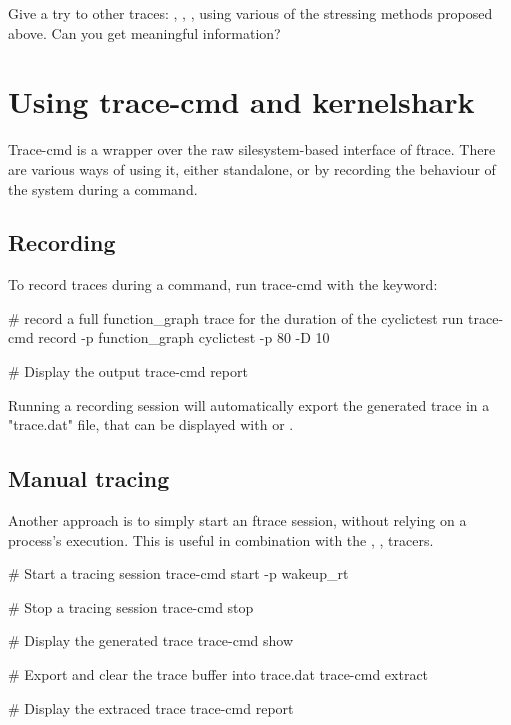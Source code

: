 Give a try to other traces: , , ,
using various of the stressing methods proposed above. Can you get meaningful information?

\section{Using trace-cmd and kernelshark}

Trace-cmd is a wrapper over the raw silesystem-based interface of ftrace. There
are various ways of using it, either standalone, or by recording the behaviour
of the system during a command.

\subsection{Recording}

To record traces during a command, run trace-cmd with the  keyword:

\begin{bashinput}
# record a full function_graph trace for the duration of the cyclictest run
trace-cmd record -p function_graph cyclictest -p 80 -D 10

# Display the output
trace-cmd report
\end{bashinput}

Running a recording session will automatically export the generated trace in a
"trace.dat" file, that can be displayed with  or .

\subsection{Manual tracing}

Another approach is to simply start an ftrace session, without relying on a process's
execution. This is useful in combination with the , ,  tracers.

\begin{bashinput}
	# Start a tracing session
	trace-cmd start -p wakeup_rt

	# Stop a tracing session
	trace-cmd stop

	# Display the generated trace
	trace-cmd show

	# Export and clear the trace buffer into trace.dat
	trace-cmd extract

	# Display the extraced trace
	trace-cmd report
\end{bashinput}

